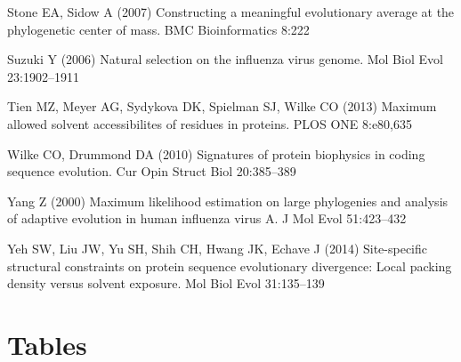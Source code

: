 \documentclass[smallextended]{svjour3}
\begin{document}
\begin{thebibliography}{55}
Stone EA, Sidow A (2007) Constructing a meaningful evolutionary average at the
  phylogenetic center of mass. BMC Bioinformatics 8:222

Suzuki Y (2006) Natural selection on the influenza virus genome. Mol Biol Evol
  23:1902--1911

Tien MZ, Meyer AG, Sydykova DK, Spielman SJ, Wilke CO (2013) Maximum allowed
  solvent accessibilites of residues in proteins. PLOS ONE 8:e80,635

Wilke CO, Drummond DA (2010) Signatures of protein biophysics in coding
  sequence evolution. Cur Opin Struct Biol 20:385--389

Yang Z (2000) Maximum likelihood estimation on large phylogenies and analysis
  of adaptive evolution in human influenza virus {A}. J Mol Evol 51:423--432

Yeh SW, Liu JW, Yu SH, Shih CH, Hwang JK, Echave J (2014) Site-specific
  structural constraints on protein sequence evolutionary divergence: Local
  packing density versus solvent exposure. Mol Biol Evol 31:135--139

\end{thebibliography}

\newpage

\section*{Tables}
\end{document}
